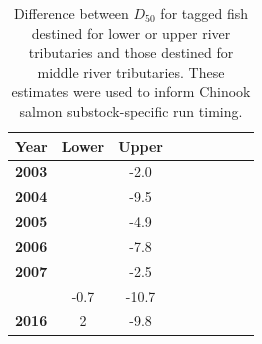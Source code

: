 \documentclass[12pt,]{book}
\theoremstyle{definition}
\theoremstyle{definition}
\theoremstyle{definition}
\theoremstyle{remark}
\begin{document}
\clearpage
\singlespacing

\begin{longtable}[t]{>{\bfseries}lcclcclcc}
\caption{\label{tab:d50-devs-table}Difference between $D_{50}$ for tagged fish destined for lower or upper river tributaries and those destined for middle river tributaries. These estimates were used to inform Chinook salmon substock-specific run timing.}\\
\toprule
\textbf{Year} & \textbf{Lower} & \textbf{Upper}\\
\midrule
2003 &  & -2.0\\
2004 &  & -9.5\\
2005 &  & -4.9\\
2006 &  & -7.8\\
2007 &  & -2.5\\
\addlinespace
2015 & -0.7 & -10.7\\
2016 & 2 & -9.8\\
\bottomrule
\end{longtable}

\clearpage
\end{document}
